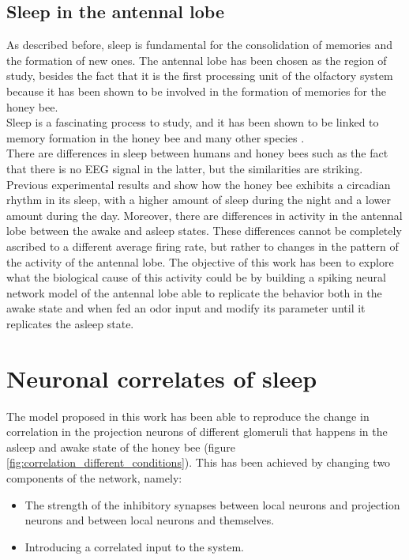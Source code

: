  \subsection{Sleep in the antennal lobe}
  As described before, sleep is fundamental for the consolidation of memories and the formation of new ones.
  The antennal lobe has been chosen as the region of study, besides the fact that it is the first processing unit of the olfactory system because it has been shown to be involved in the formation of memories for the honey bee.\\
  Sleep is a fascinating process to study, and it has been shown to be linked to memory formation in the honey bee \cite{sleep-honeybee-consolidation} and many other species \cite{sleep-mammals}.\\
  There are differences in sleep between humans and honey bees such as the fact that there is no EEG signal in the latter, but the similarities are striking.
  Previous experimental results \cite{neuronal-correlates-sleep-bee} and \cite{sleep-correlates} show how the honey bee exhibits a circadian rhythm in its sleep, with a higher amount of sleep during the night and a lower amount during the day.
  Moreover, there are differences in activity in the antennal lobe between the awake and asleep states.
  These differences cannot be completely ascribed to a different average firing rate, but rather to changes in the pattern of the activity of the antennal lobe.
  The objective of this work has been to explore what the biological cause of this activity could be by building a spiking neural network model of the antennal lobe able to replicate the behavior both in the awake state and when fed an odor input and modify its parameter until it replicates the asleep state.

\section{Neuronal correlates of sleep}
The model proposed in this work has been able to reproduce the change in correlation in the projection neurons of different glomeruli that happens in the asleep and awake state of the honey bee (figure \ref{fig:correlation_different_conditions}).
This has been achieved by changing two components of the network, namely:

\begin{itemize}
  \item The strength of the inhibitory synapses between local neurons and projection neurons and between local neurons and themselves.
  \item Introducing a correlated input to the system.
\end{itemize}

